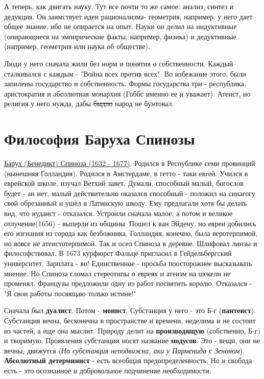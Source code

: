 А теперь, как двигать науку. Тут все почти то же самое: анализ, синтез и дедукция. Он заимствует идеи рационализма- геометрия, например, у него дает общее знание, ибо не опирается на опыт. Науки он делил на индуктивные (опирающиеся на эмпирические факты, например, физика) и дедуктивные (например, геометрия или наука об обществе).

Люди у него сначала жили без норм и понятия о собственности. Каждый сталкивался с каждым - "Война всех против всех". Во избежание этого, были запилены государство и собственность. Формы государства три - республика, аристократия и абсолютная монархия (Гоббс именно ее и уважает). Атеист, но религия у него нужда, дабы \sout{быдло} народ не бунтовал.

\section{Философия Баруха Спинозы}
\underline{Барух (Бенедикт) Спиноза (1632 - 1677)}. Родился в Республике семи провинций (нынешняя Голландия). Родился в Амстердаме, в гетто - таки евrей. Учился в еврейской школе, изучал Ветхий завет. Думали, способный малый, богослов будет - ан нет, малый действительно оказался способный - положил на синагогу свой обрезанный и ушел в Латинскую школу. Ему предлагали хотя бы делать вид, что иудаист - отказался. Устроили сначала малое, а потом и великое отлучение(1656) - выперли из общины. Пошел к ван Эйдену, но евреи добились его изгнания из города как безбожника. Голландия, конечно, была веротерпимой, но вовсе не атеистотерпимой. Так и осел Спиноза в деревне. Шлифовал линзы и философствовал. В 1673 курфюрст Фальце пригласил в Гейдельбергский университет. Зарплата - во! Единственное - просьба поосторожнее высказывать мнение. Но Спиноза сломал стереотипы о евреях и атеизм на шекели не променял. Французы предложили одну из работ посвятить королю. Отказался - "Я свои работы посвящаю только истине!"

Сначала был \textbf{дуалист}. Потом - \textbf{монист}. Субстанция у него  - это Б-г (\textbf{пантеист}). Субстанция вечна, бесконечна в пространстве и времени, неделима и не состоит из частей, а еще она мыслит. Природу делит на \textbf{производящую} (собственно, Б-г) и творимую. Проявления субстанции носят название \textbf{модусов}. Это - вещи, они не вечны, движутся (\textit{Но субстанция неподвижна, аки у Парменида с Зеноном}). \textbf{Абсолютный детерминист} - есть всеобщая предопределенность. Но и свобода есть - это осознанное и добровольное подчинение необходимости.

